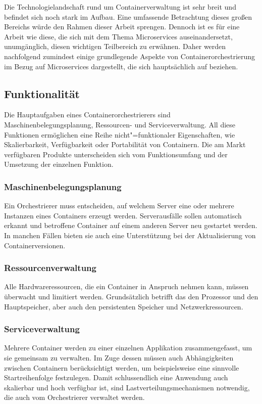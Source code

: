 Die Technologielandschaft rund um Containerverwaltung ist sehr breit und befindet sich noch stark im Aufbau. Eine umfassende Betrachtung dieses großen Bereichs würde den Rahmen dieser Arbeit sprengen. Dennoch ist es für eine Arbeit wie diese, die sich mit dem Thema Microservices auseinandersetzt, unumgänglich, diesen wichtigen Teilbereich zu erwähnen. Daher werden nachfolgend zumindest einige grundlegende Aspekte von Containerorchestrierung im Bezug auf Microservices dargestellt, die sich hauptsächlich auf \cite{ContainerOrcaWars} beziehen. 

\subsection{Funktionalität}

Die Hauptaufgaben eines Containerorchestrierers sind Maschinenbelegungsplanung, Ressourcen- und Serviceverwaltung. All diese Funktionen ermöglichen eine Reihe nicht"=funktionaler Eigenschaften, wie Skalierbarkeit, Verfügbarkeit oder Portabilität von Containern. Die am Markt verfügbaren Produkte unterscheiden sich vom Funktionsumfang und der Umsetzung der einzelnen Funktion.

\subsubsection{Maschinenbelegungsplanung}

Ein Orchestrierer muss entscheiden, auf welchem Server eine oder mehrere Instanzen eines Containers erzeugt werden. Serverausfälle sollen automatisch erkannt und betroffene Container auf einem anderen Server neu gestartet werden. In manchen Fällen bieten sie auch eine Unterstützung bei der Aktualisierung von Containerversionen.

\subsubsection{Ressourcenverwaltung}

Alle Hardwareressourcen, die ein Container in Anspruch nehmen kann, müssen überwacht und limitiert werden. Grundsätzlich betrifft das den Prozessor und den Hauptspeicher, aber auch den persistenten Speicher und Netzwerkressourcen.

\subsubsection{Serviceverwaltung}

Mehrere Container werden zu einer einzelnen Applikation zusammengefasst, um sie gemeinsam zu verwalten. Im Zuge dessen müssen auch Abhängigkeiten zwischen Containern berücksichtigt werden, um beispielsweise eine sinnvolle Startreihenfolge festzulegen. Damit schlussendlich eine Anwendung auch skalierbar und hoch verfügbar ist, sind Lastverteilungsmechanismen notwendig, die auch vom Orchestrierer verwaltet werden.

